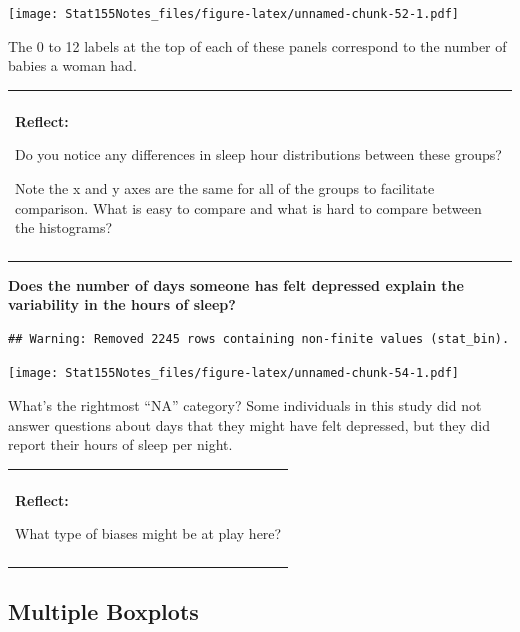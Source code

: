 \documentclass[]{book}
\newenvironment{Shaded}{\begin{snugshade}}{\end{snugshade}}
\newcommand{\DataTypeTok}[1]{\textcolor[rgb]{0.13,0.29,0.53}{#1}}
\newcommand{\DecValTok}[1]{\textcolor[rgb]{0.00,0.00,0.81}{#1}}
\newcommand{\KeywordTok}[1]{\textcolor[rgb]{0.13,0.29,0.53}{\textbf{#1}}}
\newcommand{\NormalTok}[1]{#1}
\newcommand{\OperatorTok}[1]{\textcolor[rgb]{0.81,0.36,0.00}{\textbf{#1}}}
\newcommand{\StringTok}[1]{\textcolor[rgb]{0.31,0.60,0.02}{#1}}
\newenvironment{reflect}
{
    \begin{center}
    
    \begin{tabular}{|p{0.8\textwidth}|}
    \rowcolor{LightBlue}
    \hline\\
    \rowcolor{LightBlue}
    \textbf{Reflect:}
}
{
    \\\rowcolor{LightBlue}
    \\\hline
    \end{tabular} 
    \end{center}
}
\begin{document}
\texttt{[image: Stat155Notes\_files/figure-latex/unnamed-chunk-52-1.pdf]}

The 0 to 12 labels at the top of each of these panels correspond to the number of babies a woman had.

\begin{reflect}
Do you notice any differences in sleep hour distributions between these
groups?

Note the x and y axes are the same for all of the groups to facilitate
comparison. What is easy to compare and what is hard to compare between
the histograms?
\end{reflect}

\textbf{Does the number of days someone has felt depressed explain the variability in the hours of sleep?}

\begin{Shaded}
\end{Shaded}

\begin{verbatim}
## Warning: Removed 2245 rows containing non-finite values (stat_bin).
\end{verbatim}

\texttt{[image: Stat155Notes\_files/figure-latex/unnamed-chunk-54-1.pdf]}

What's the rightmost ``NA'' category? Some individuals in this study did not answer questions about days that they might have felt depressed, but they did report their hours of sleep per night.

\begin{reflect}
What type of biases might be at play here?
\end{reflect}

\hypertarget{multiple-boxplots}{%
\subsection{Multiple Boxplots}\label{multiple-boxplots}}
\end{document}
